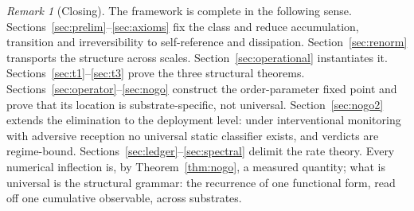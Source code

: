 \documentclass[11pt]{article}
\theoremstyle{plain}
\theoremstyle{definition}
\theoremstyle{remark}
\newtheorem{remark}[theorem]{Remark}
\begin{document}
\begin{remark}[Closing]
The framework is complete in the following sense. Sections~\ref{sec:prelim}--\ref{sec:axioms} fix the class and reduce accumulation, transition and irreversibility to self-reference and dissipation. Section~\ref{sec:renorm} transports the structure across scales. Section~\ref{sec:operational} instantiates it. Sections~\ref{sec:t1}--\ref{sec:t3} prove the three structural theorems. Sections~\ref{sec:operator}--\ref{sec:nogo} construct the order-parameter fixed point and prove that its location is substrate-specific, not universal. Section~\ref{sec:nogo2} extends the elimination to the deployment level: under interventional monitoring with adversive reception no universal static classifier exists, and verdicts are regime-bound. Sections~\ref{sec:ledger}--\ref{sec:spectral} delimit the rate theory. Every numerical inflection is, by Theorem~\ref{thm:nogo}, a measured quantity; what is universal is the structural grammar: the recurrence of one functional form, read off one cumulative observable, across substrates.
\end{remark}
\end{document}
